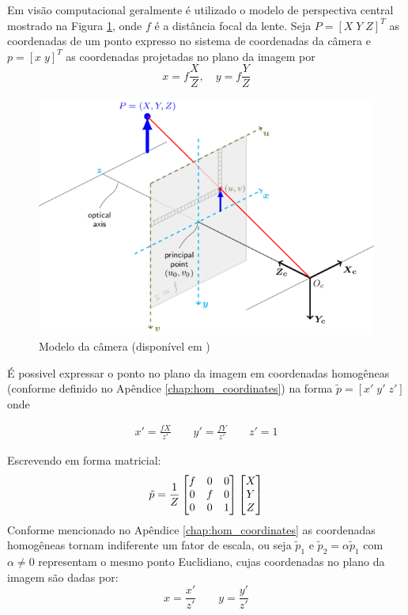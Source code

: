 Em visão computacional geralmente é utilizado o modelo de perspectiva central mostrado na Figura \ref{fig:camera_model}, onde $f$ é a distância focal da lente.
Seja ${P} = [X\; Y\; Z]^T$ as coordenadas de um ponto expresso no sistema de coordenadas da câmera e ${p} = [x\;y]^T$ as coordenadas projetadas no plano da imagem por
\begin{equation}
x = f \frac{X}{Z}, \quad y = f \frac{Y}{Z}
\end{equation}

\begin{figure}[h!]
  \centering
  \includegraphics[width=0.8\linewidth]{./img/camera_model3.png}
\caption{Modelo da câmera (disponível em \citep{opencvCameraCalibration})}
\label{fig:camera_model}
\end{figure}

É possivel expressar o ponto no plano da imagem em coordenadas homogêneas (conforme definido no Apêndice \ref{chap:hom_coordinates}) na forma $\tilde{{p}} = [x'\; y' \; z']$ onde 

\begin{align}
x' = \frac{fX}{z'} \qquad  y' = \frac{fY}{z'} \qquad z' = 1
\end{align}

Escrevendo em forma matricial:
\begin{equation}
 {\tilde{p}} = \frac{1}{Z}
\begin{bmatrix} f & 0 & 0 \\
	 0 & f & 0 \\
	 0 & 0 & 1	
\end{bmatrix}
\begin{bmatrix}X\\Y\\Z\end{bmatrix}
\end{equation}
Conforme mencionado no Apêndice \ref{chap:hom_coordinates} as coordenadas homogêneas tornam indiferente um fator de escala, ou seja $\tilde{p}_1$ e $\tilde{p}_2 = \alpha \tilde{p}_1$ com $\alpha \neq 0$ representam o mesmo ponto Euclidiano, cujas coordenadas no plano da imagem são dadas por:
\[ x = \frac{x'}{z'} \qquad y = \frac{y'}{z'}\]

